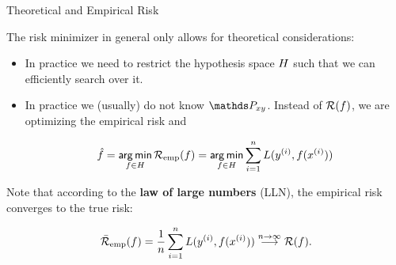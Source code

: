 \begin{vbframe}{Theoretical and Empirical Risk}  
 

The risk minimizer in general only allows for theoretical considerations: 

\begin{itemize}
	\item In practice we need to restrict the hypothesis space $H$ such that we can efficiently search over it. 
	\item In practice we (usually) do not know $\Pxy$. Instead of $\mathcal{R}(f)$, we are optimizing the empirical risk and 

	\begin{eqnarray*}
		\hat f = \mathop{\sf arg\,min}_{f \in H} \mathcal{R}_{\text{emp}}(f) = \mathop{\sf arg\,min}_{f \in H} \sum_{i=1}^n L(y^{(i)}, f(x^{(i)}))
	\end{eqnarray*}

\end{itemize}

Note that according to the \textbf{law of large numbers} (LLN), the empirical risk converges to the true risk: 

\begin{eqnarray*}
	\bar{\mathcal{R}}_\text{emp}(f) = \frac{1}{n} \sum_{i=1}^n L(y^{(i)}, f(x^{(i)})) \overset{n \to \infty}{\longrightarrow} \mathcal{R}(f). 
\end{eqnarray*}

\end{vbframe}



